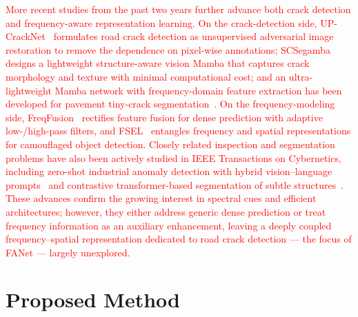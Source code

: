 \documentclass[journal]{IEEEtran}
\begin{document}
\textcolor{red}{More recent studies from the past two years further advance both crack detection and frequency-aware representation learning. On the crack-detection side, UP-CrackNet~\cite{TITS24_UPCrackNet} formulates road crack detection as unsupervised adversarial image restoration to remove the dependence on pixel-wise annotations; SCSegamba~\cite{CVPR25_SCSegamba} designs a lightweight structure-aware vision Mamba that captures crack morphology and texture with minimal computational cost; and an ultra-lightweight Mamba network with frequency-domain feature extraction has been developed for pavement tiny-crack segmentation~\cite{ESWA25_MambaFreqCrack}. On the frequency-modeling side, FreqFusion~\cite{TPAMI24_FreqFusion} rectifies feature fusion for dense prediction with adaptive low-/high-pass filters, and FSEL~\cite{ECCV24_FSEL} entangles frequency and spatial representations for camouflaged object detection. Closely related inspection and segmentation problems have also been actively studied in IEEE Transactions on Cybernetics, including zero-shot industrial anomaly detection with hybrid vision--language prompts~\cite{TCYB25_AnomalyVLM} and contrastive transformer-based segmentation of subtle structures~\cite{TCYB24_CTNet}. These advances confirm the growing interest in spectral cues and efficient architectures; however, they either address generic dense prediction or treat frequency information as an auxiliary enhancement, leaving a deeply coupled frequency--spatial representation dedicated to road crack detection --- the focus of FANet --- largely unexplored.}





\section{Proposed Method}
\end{document}
